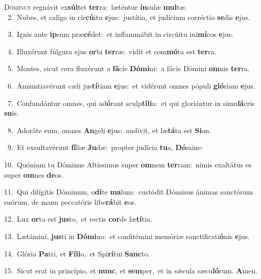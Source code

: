 \lettrine{\initial\textcolor{\initialcolor}{D}}{óminus} regnávit ex\-\textbf{súl}\-tet \textbf{ter}\-ra:~\star læténtur \textbf{ín}\-sulæ \textbf{mul}\-tæ.\\
{\numbfont\textcolor{\numbcolor}{~2.}}~Nubes, et calígo in cir\-\textbf{cú}\-itu \textbf{e}\-jus:~\star justítia, et judícium corréctio \textbf{se}\-dis \textbf{e}\-jus.\par
{\numbfont\textcolor{\numbcolor}{~3.}}~Ignis ante \textbf{ip}\-sum præ\-\textbf{cé}\-det:~\star et inflammábit in circúitu ini\-\textbf{mí}\-cos \textbf{e}\-jus.\par
{\numbfont\textcolor{\numbcolor}{~4.}}~Illuxérunt fúlgura ejus \textbf{or}\-bi \textbf{ter}\-ræ:~\star vidit et com\-\textbf{mó}\-ta est \textbf{ter}\-ra.\par
{\numbfont\textcolor{\numbcolor}{~5.}}~Montes, sicut cera fluxérunt a \textbf{fá}\-cie \textbf{Dó}\-\textbf{mi}ni:~\star a fácie Dómini \textbf{om}\-nis \textbf{ter}\-ra.\par
{\numbfont\textcolor{\numbcolor}{~6.}}~Annuntiavérunt cæli jus\-\textbf{tí}\-tiam \textbf{e}\-jus:~\star et vidérunt omnes pópuli \textbf{gló}\-riam \textbf{e}\-jus.\par
{\numbfont\textcolor{\numbcolor}{~7.}}~Confundántur omnes, qui ad\-\textbf{ó}\-rant sculp\-\textbf{tí}\-\textbf{li}a:~\star et qui gloriántur in simu\-\textbf{lá}\-cris \textbf{su}\-is.\par
{\numbfont\textcolor{\numbcolor}{~8.}}~Adoráte eum, omnes \textbf{An}\-geli \textbf{e}\-jus:~\star audívit, et læ\-\textbf{tá}\-ta est \textbf{Si}\-on.\par
{\numbfont\textcolor{\numbcolor}{~9.}}~Et exsultavérunt \textbf{fí}\-liæ \textbf{Ju}\-dæ:~\star propter judícia \textbf{tu}\-a, \textbf{Dó}\-mine:\par
{\numbfont\textcolor{\numbcolor}{10.}}~Quóniam tu Dóminus Altíssimus super \textbf{om}\-nem \textbf{ter}\-ram:~\star nimis exaltátus es super \textbf{om}\-nes \textbf{de}\-os.\par
{\numbfont\textcolor{\numbcolor}{11.}}~Qui dilígitis Dóminum, o\-\textbf{dí}\-te \textbf{ma}\-lum:~\star custódit Dóminus ánimas sanctórum suórum, de manu peccatóris libe\-\textbf{rá}\-bit \textbf{e}\-os.\par
{\numbfont\textcolor{\numbcolor}{12.}}~Lux \textbf{or}\-ta est \textbf{jus}\-to,~\star et rectis \textbf{cor}\-de læ\-\textbf{tí}\-tia.\par
{\numbfont\textcolor{\numbcolor}{13.}}~Lætámini, \textbf{jus}\-ti in \textbf{Dó}\-\textbf{mi}no:~\star et confitémini memóriæ sanctificati\-\textbf{ó}\-nis \textbf{e}\-jus.\par
{\numbfont\textcolor{\numbcolor}{14.}}~Glória \textbf{Pa}\-tri, et \textbf{Fí}\-\textbf{li}o,~\star et Spi\-\textbf{rí}\-tui \textbf{Sanc}\-to.\par
{\numbfont\textcolor{\numbcolor}{15.}}~Sicut erat in princípio, et \textbf{nunc}\-, et \textbf{sem}\-per,~\star et in sǽcula sæcu\-\textbf{ló}\-rum. \textbf{A}\-men.\par
